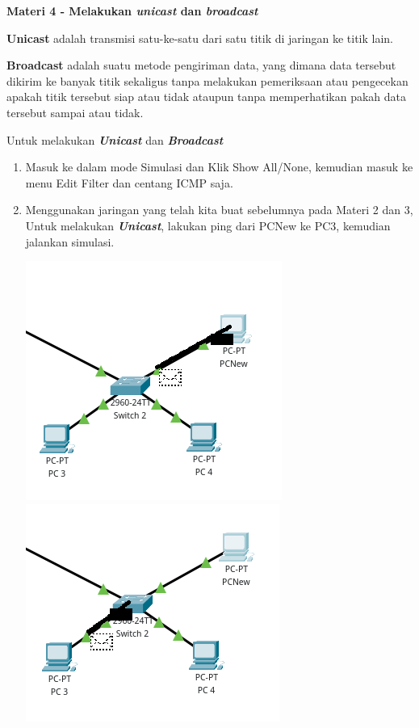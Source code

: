 \documentclass{article}
\begin{document}
    \begin{flushleft}
        \textbf{Materi 4 - Melakukan \textit{unicast} dan \textit{broadcast}}
        \newline

        \textbf{Unicast} adalah transmisi satu-ke-satu dari satu titik di jaringan ke titik lain.
        \newline

        \textbf{Broadcast} adalah suatu metode pengiriman data, yang dimana data tersebut dikirim ke banyak titik sekaligus tanpa melakukan pemeriksaan atau pengecekan apakah titik tersebut siap atau tidak ataupun tanpa memperhatikan pakah data tersebut sampai atau tidak.
        \newline

        Untuk melakukan \textbf{\textit{Unicast}} dan \textbf{\textit{Broadcast}}
        \begin{enumerate}
            \item Masuk ke dalam mode Simulasi dan Klik Show All/None, kemudian masuk ke menu Edit Filter dan centang ICMP saja.
            \item Menggunakan jaringan yang telah kita buat sebelumnya pada Materi 2 dan 3, Untuk melakukan \textbf{\textit{Unicast}}, lakukan ping dari PCNew ke PC3, kemudian jalankan simulasi.

            \includegraphics[scale=0.65]{4-sim1.png}
            \includegraphics[scale=0.65]{4-sim2.png}


\end{enumerate}
\end{flushleft}
\end{document}
